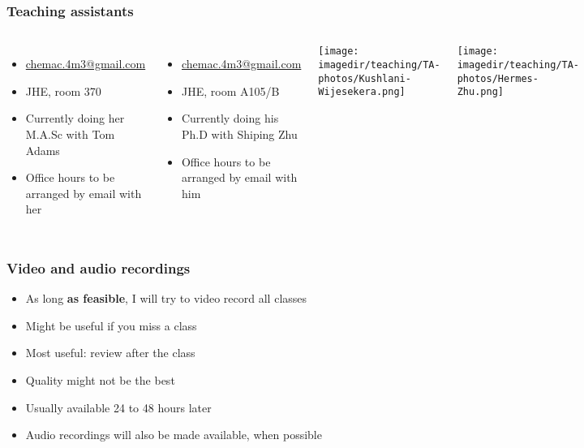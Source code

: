 \begin{frame}\frametitle{Teaching assistants}
	
	\begin{columns}[b]
			{\color{myGreen}{Kushlani Wijesekera}}
			\begin{itemize}
				\item	\url{chemac.4m3@gmail.com}
				\item	JHE, room 370
				\item	Currently doing her M.A.Sc with Tom Adams
				\item	Office hours to be arranged by email with her
			\end{itemize}
			
			\vspace{1cm}
			{\color{myGreen}{Hermes Zhu}}
			\begin{itemize}
				\item	\url{chemac.4m3@gmail.com}
				\item	JHE, room A105/B
				\item	Currently doing his Ph.D with Shiping Zhu
				\item	Office hours to be arranged by email with him
			\end{itemize}
			\centerline{\texttt{[image: \\imagedir/teaching/TA-photos/Kushlani-Wijesekera.png]}}
			
			\vspace{0.5cm}
			\centerline{\texttt{[image: \\imagedir/teaching/TA-photos/Hermes-Zhu.png]}}
	\end{columns}
	
\end{frame}

\begin{frame}\frametitle{Video and audio recordings}
	\begin{itemize}
		\item	As long \textbf{as feasible}, I will try to video record all classes
		\item	Might be useful if you miss a class
		\item	Most useful: review after the class
		\item	Quality might not be the best
		\item	Usually available 24 to 48 hours later
		\item	Audio recordings will also be made available, when possible
	\end{itemize}
\end{frame}

